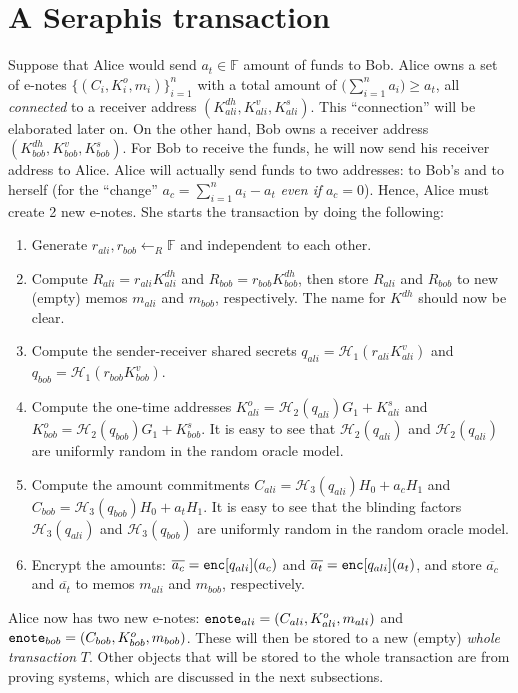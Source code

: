 \documentclass{article}
\begin{document}
\section{A Seraphis transaction}
Suppose that Alice would send $a_t\in\mathbb{F}$ amount of funds to Bob. Alice owns a set of e-notes $\{(C_i,K_i^o,m_i)\}_{i=1}^n$ with a total amount of $\big(\sum_{i=1}^{n}{a_i}\big)\ge a_t$, all \textit{connected} to a receiver address $(K_{ali}^{dh}, K_{ali}^v, K_{ali}^s)$. This ``connection'' will be elaborated later on. On the other hand, Bob owns a receiver address $(K_{bob}^{dh}, K_{bob}^v, K_{bob}^s)$. For Bob to receive the funds, he will now send his receiver address to Alice. Alice will actually send funds to two addresses: to Bob's and to herself (for the ``change'' $a_c = \sum_{i=1}^{n}{a_i} - a_t$ \textit{even if} $a_c=0$). Hence, Alice must create 2 new e-notes. She starts the transaction by doing the following:
\begin{enumerate}
    \item Generate $r_{ali}, r_{bob}\leftarrow_R\mathbb{F}$ and independent to each other.
    \item Compute $R_{ali} = r_{ali}K_{ali}^{dh}$ and $R_{bob} = r_{bob}K_{bob}^{dh}$, then store $R_{ali}$ and $R_{bob}$ to new (empty) memos $m_{ali}$ and $m_{bob}$, respectively. The name for $K^{dh}$ should now be clear.
    \item Compute the sender-receiver shared secrets $q_{ali} = \mathcal{H}_1(r_{ali}K_{ali}^{v})$ and $q_{bob} = \mathcal{H}_1(r_{bob}K_{bob}^{v})$.
    \item Compute the one-time addresses $K_{ali}^{o} = \mathcal{H}_2(q_{ali})G_1 + K_{ali}^s$ and $K_{bob}^{o} = \mathcal{H}_2(q_{bob})G_1 + K_{bob}^s$. It is easy to see that $\mathcal{H}_2(q_{ali})$ and $\mathcal{H}_2(q_{ali})$ are uniformly random in the random oracle model.
    \item Compute the amount commitments $C_{ali} = \mathcal{H}_3(q_{ali})H_0 + a_c H_1$ and $C_{bob} = \mathcal{H}_3(q_{bob})H_0 + a_t H_1$. It is easy to see that the blinding factors $\mathcal{H}_3(q_{ali})$ and $\mathcal{H}_3(q_{bob})$ are uniformly random in the random oracle model.
    \item Encrypt the amounts: $\overline{a_c} = {\tt enc}[q_{ali}](a_c)$ and $\overline{a_t} = {\tt enc}[q_{ali}](a_t)$, and store $\overline{a_c}$ and $\overline{a_t}$ to memos $m_{ali}$ and $m_{bob}$, respectively.
\end{enumerate}
Alice now has two new e-notes: ${\tt enote}_{ali} = (C_{ali}, K_{ali}^o, m_{ali})$ and ${\tt enote}_{bob} = (C_{bob}, K_{bob}^o, m_{bob})$. These will then be stored to a new (empty) \textit{whole transaction} $T$. Other objects that will be stored to the whole transaction are from proving systems, which are discussed in the next subsections.
\end{document}
